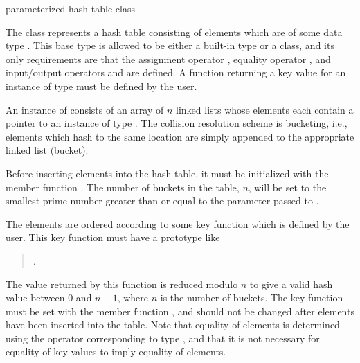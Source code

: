 
\newcommand{\HT}{\mathit{HT}}



\NAME

 \dotfill parameterized hash table class



\ABSTRACT

The class  represents a hash table consisting of elements which are of
some data type .  This base type is allowed to be either a built-in type or a class, and
its only requirements are that the assignment operator \code{=}, equality operator \code{==},
and input/output operators \code{>>} and \code{<<} are defined.  A function returning a key
value for an instance of type  must be defined by the user.



\DESCRIPTION

An instance of  consists of an array of $n$ linked lists whose elements
each contain a pointer to an instance of type .  The collision resolution scheme is
bucketing, i.e., elements which hash to the same location are simply appended to the appropriate
linked list (bucket).

Before inserting elements into the hash table, it must be initialized with the member function
.  The number of buckets in the table, $n$, will be set to the smallest prime
number greater than or equal to the parameter passed to .

The elements are ordered according to some key function which is defined by the user.  This key
function must have a prototype like
\begin{quote}
  .
\end{quote}
The value returned by this function is reduced modulo $n$ to give a valid hash value between $0$
and $n-1$, where $n$ is the number of buckets.  The key function must be set with the member
function , and should not be changed after elements have been inserted
into the table.  Note that equality of elements is determined using the \code{==} operator
corresponding to type , and that it is not necessary for equality of key values to imply
equality of elements.


